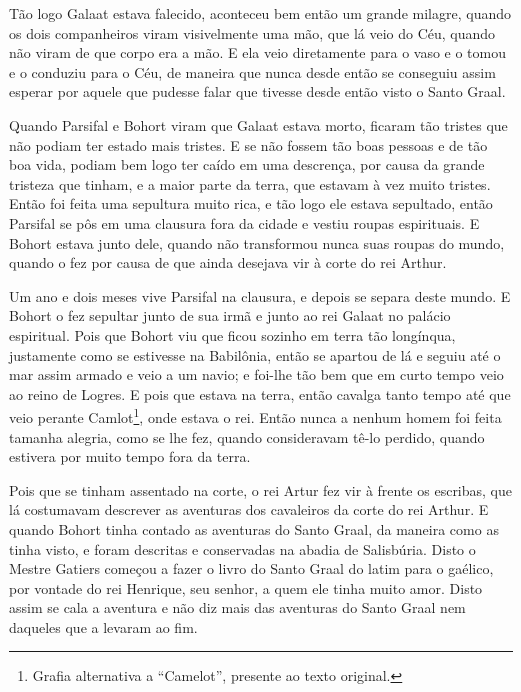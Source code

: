 Tão logo Galaat estava falecido, aconteceu bem então um grande milagre, quando
os dois companheiros viram visivelmente uma mão, que lá veio do Céu, quando não
viram de que corpo era a mão. E ela veio diretamente para o vaso e o tomou e o
conduziu para o Céu, de maneira que nunca desde então se conseguiu assim
esperar por aquele que pudesse falar que tivesse desde então visto o Santo
Graal. 

Quando Parsifal e Bohort viram que Galaat estava morto, ficaram tão tristes que
não podiam ter estado mais tristes. E se não fossem tão boas pessoas e de tão
boa vida, podiam bem logo ter caído em uma descrença, por causa da grande
tristeza que tinham, e a maior parte da terra, que estavam à vez muito tristes.
Então foi feita uma sepultura muito rica, e tão logo ele estava sepultado,
então Parsifal se pôs em uma clausura fora da cidade e vestiu roupas
espirituais. E Bohort estava junto dele, quando não transformou nunca suas
roupas do mundo, quando o fez por causa de que ainda desejava vir à corte do
rei Arthur.

Um ano e dois meses vive Parsifal na clausura, e depois se separa deste mundo.
E Bohort o fez sepultar junto de sua irmã e junto ao rei Galaat no palácio
espiritual. Pois que Bohort viu que ficou sozinho em terra tão longínqua,
justamente como se estivesse na Babilônia, então se apartou de lá e seguiu até
o mar assim armado e veio a um navio; e foi-lhe tão bem que em curto tempo veio
ao reino de Logres. E pois que estava na terra, então cavalga tanto tempo até
que veio perante Camlot\footnote{ Grafia alternativa a “Camelot”, presente ao
texto original.},  onde estava o rei. Então nunca a nenhum homem
foi feita tamanha alegria, como se lhe fez, quando consideravam tê-lo perdido,
quando estivera por muito tempo fora da terra.

Pois que se tinham assentado na corte, o rei Artur fez vir à frente os escribas,
que lá costumavam descrever as aventuras dos cavaleiros da corte do rei Arthur.
E quando Bohort tinha contado as aventuras do Santo Graal, da maneira como as
tinha visto, e foram descritas e conservadas na abadia de Salisbúria. Disto o
Mestre Gatiers começou a fazer o livro do Santo Graal do latim para o gaélico,
por vontade do rei Henrique, seu senhor, a quem ele tinha muito amor. Disto
assim se cala a aventura e não diz mais das aventuras do Santo Graal nem
daqueles que a levaram ao fim. 


